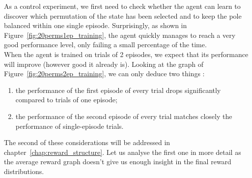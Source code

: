 \begin{table}
	\centering
	\caption{State permutations used for training and testing}
	\label{tab:20perms}
\end{table}

As a control experiment, we first need to check whether the agent can learn
to discover which permutation of the state has been selected and to keep the
pole balanced within one single episode. Surprisingly, as shown in 
Figure~\ref{fig:20perms1ep_training}, the agent quickly manages to reach
a very good performance level, only failing a small percentage of the time.\\

When the agent is trained on trials of 2 episodes, we expect that its
performance will improve (however good it already is). Looking at the graph 
of Figure~\ref{fig:20perms2ep_training}, we can only deduce two things : 
\begin{enumerate}
	\item the performance of the first episode of every trial drops 
		significantly compared to trials of one episode;
	\item the performance of the second episode of every trial matches
		closely the performance of single-episode trials.
\end{enumerate}
The second of these considerations will be addressed in
chapter~\ref{chap:reward_structure}. Let us analyse the first one in more detail
as the average reward graph doesn't give us enough insight in the final
reward distributions.\\

